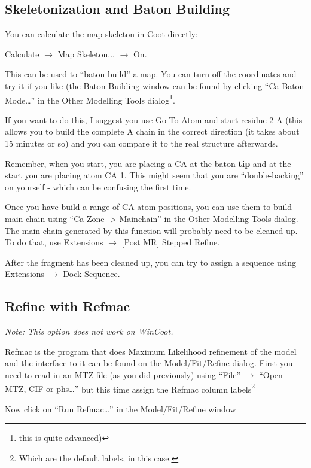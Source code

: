 \documentclass{article}
\begin{document}
\subsection{Skeletonization and Baton Building}

You can calculate the map skeleton in Coot directly:

\textsf{Calculate $\rightarrow$ Map Skeleton... $\rightarrow$ On.}

This can be used to ``baton build'' a map.  You can turn off the
coordinates and try it if you like (the Baton Building window can be
found by clicking \textsf{``Ca Baton Mode\ldots''} in the Other
Modelling Tools dialog\footnote{this is quite advanced)}.
  
If you want to do this, I suggest you use Go To Atom and start residue
2 A (this allows you to build the complete A chain in the correct
direction (it takes about 15 minutes or so) and you can compare it to
the real structure afterwards.
  
  Remember, when you start, you are placing a CA at the baton
  \textbf{tip} and at the start you are placing atom CA 1.  This might
  seem that you are ``double-backing'' on yourself - which can be
  confusing the first time.

Once you have build a range of CA atom positions, you can use them to
build main chain using ``Ca Zone -> Mainchain'' in the Other Modelling
Tools dialog.  The main chain generated by this function will probably
need to be cleaned up.  To do that, use \textsf{Extensions
$\rightarrow$ [Post MR] Stepped Refine}.

After the fragment has been cleaned up, you can try to assign a sequence using
\textsf{Extensions $\rightarrow$ Dock Sequence}.

\subsection{Refine with Refmac}

\emph{Note: This option does not work on WinCoot.}

Refmac is the program that does Maximum Likelihood refinement of the
model and the interface to it can be found on the Model/Fit/Refine
dialog.  First you need to read in an MTZ file (as you did previously)
using \textsf{``File'' $\rightarrow$ ``Open MTZ, CIF or phs\ldots''}
but this time assign the Refmac column labels\footnote{Which are the
  default labels, in this case.} 

Now click on \textsf{``Run Refmac\ldots''} in the Model/Fit/Refine
window
\end{document}
